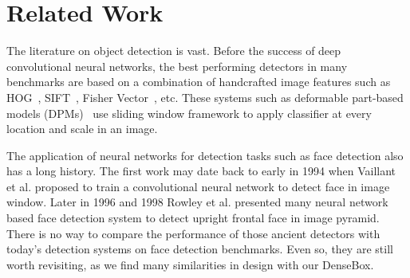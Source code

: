 

\section{Related Work}

The literature on object detection is vast. Before the success of deep convolutional neural networks, the best performing detectors in many benchmarks are based on a combination of handcrafted image features such as HOG~\cite{}, SIFT~\cite{}, Fisher Vector~\cite{}, etc. These systems such as deformable part-based models (DPMs)~\cite{} use sliding window framework to apply classifier at every location and scale in an image.

The application of neural networks for detection tasks such as face detection also has a long history. The first work may date back to early in 1994 when Vaillant et al.\cite{vaillant1994original} proposed to train a convolutional neural network to detect face in image window. Later in 1996 and 1998 Rowley et al.\cite{rowley1998neural,rowley1998rotation} presented many neural network based face detection system to detect upright frontal face in image pyramid. There is no way to compare the performance of those ancient detectors with today’s detection systems on face detection benchmarks. Even so, they are still worth revisiting, as we find many similarities in design with our DenseBox. 

